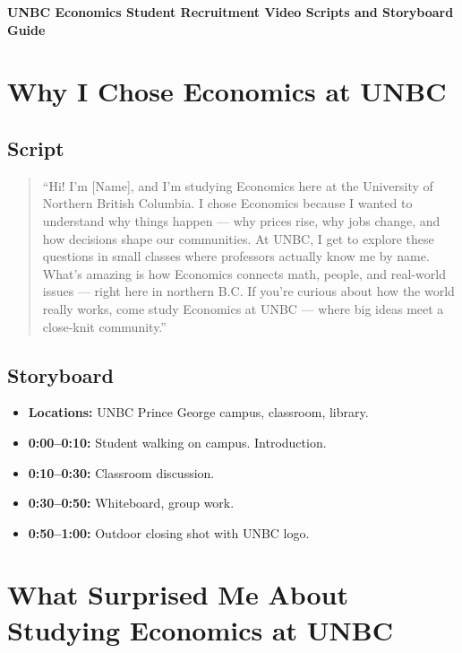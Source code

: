 \documentclass[12pt]{article}
\begin{document}
\begin{center}
    \Large\textbf{UNBC Economics Student Recruitment Video Scripts and Storyboard Guide}
\end{center}

\vspace{1em}

\section{Why I Chose Economics at UNBC}

\subsection*{Script}
\begin{quote}
``Hi! I’m [Name], and I’m studying Economics here at the University of Northern British Columbia. 
I chose Economics because I wanted to understand why things happen — why prices rise, why jobs change, and how decisions shape our communities. 
At UNBC, I get to explore these questions in small classes where professors actually know me by name. 
What’s amazing is how Economics connects math, people, and real-world issues — right here in northern B.C. 
If you’re curious about how the world really works, come study Economics at UNBC — where big ideas meet a close-knit community.''
\end{quote}

\subsection*{Storyboard}
\begin{itemize}[leftmargin=*]
    \item \textbf{Locations:} UNBC Prince George campus, classroom, library.
    \item \textbf{0:00–0:10:} Student walking on campus. Introduction.
    \item \textbf{0:10–0:30:} Classroom discussion. 
    \item \textbf{0:30–0:50:} Whiteboard, group work.
    \item \textbf{0:50–1:00:} Outdoor closing shot with UNBC logo.
\end{itemize}

\section{What Surprised Me About Studying Economics at UNBC}
\end{document}
